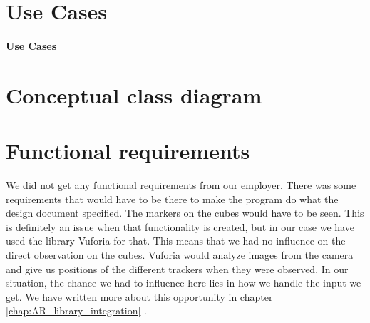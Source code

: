 \section{Use Cases}

\paragraph{Use Cases}

\section{Conceptual class diagram}
\section{Functional requirements}
We did not get any functional requirements from our employer. There was
some requirements that would have to be there to make the program do what the
design document specified. The markers on the cubes would have to be seen. This is definitely an issue when that functionality is created, but in our case we have used the library \gls{Vuforia} for that. This means that we had no influence on the direct observation on the cubes. Vuforia would analyze images from the camera and give us positions of the different trackers when they were observed. In our situation, the chance we had to influence here lies in how we handle the input we get. We have written more about this opportunity in chapter \ref{chap:AR_library_integration} .


